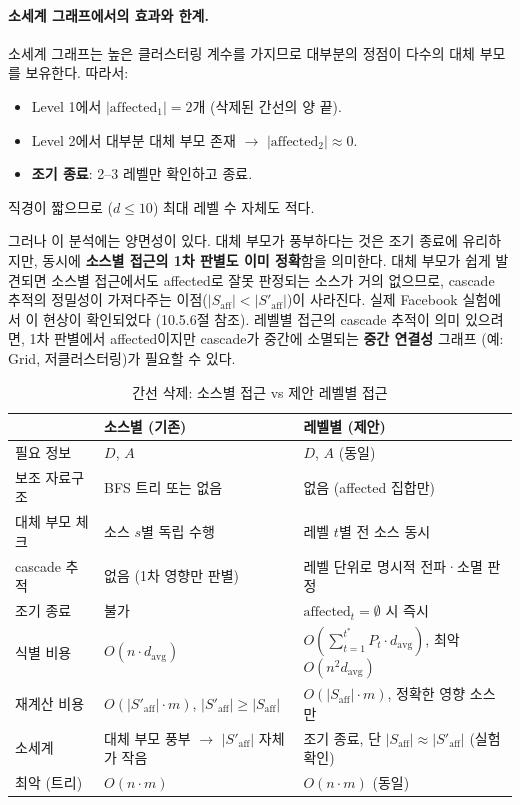 \documentclass[11pt,a4paper]{article}
\begin{document}
\paragraph{소세계 그래프에서의 효과와 한계.}
소세계 그래프는 높은 클러스터링 계수를 가지므로 대부분의 정점이 다수의 대체 부모를 보유한다. 따라서:
\begin{itemize}[leftmargin=1.4em]
  \item Level 1에서 $|\text{affected}_1| = 2$개 (삭제된 간선의 양 끝).
  \item Level 2에서 대부분 대체 부모 존재 $\to$ $|\text{affected}_2| \approx 0$.
  \item \textbf{조기 종료}: 2--3 레벨만 확인하고 종료.
\end{itemize}
직경이 짧으므로 ($d \leq 10$) 최대 레벨 수 자체도 적다.

\noindent 그러나 이 분석에는 양면성이 있다. 대체 부모가 풍부하다는 것은 조기 종료에 유리하지만, 동시에 \textbf{소스별 접근의 1차 판별도 이미 정확}함을 의미한다. 대체 부모가 쉽게 발견되면 소스별 접근에서도 affected로 잘못 판정되는 소스가 거의 없으므로, cascade 추적의 정밀성이 가져다주는 이점($|S_{\text{aff}}| < |S'_{\text{aff}}|$)이 사라진다. 실제 Facebook 실험에서 이 현상이 확인되었다 (10.5.6절 참조). 레벨별 접근의 cascade 추적이 의미 있으려면, 1차 판별에서 affected이지만 cascade가 중간에 소멸되는 \textbf{중간 연결성} 그래프 (예: Grid, 저클러스터링)가 필요할 수 있다.

\begin{table}[H]\centering
\caption{간선 삭제: 소스별 접근 vs 제안 레벨별 접근}
\small
\begin{tabular}{@{}p{2.8cm}p{5.5cm}p{5.5cm}@{}}
\toprule
& \textbf{소스별 (기존)} & \textbf{레벨별 (제안)} \\
\midrule
필요 정보 & $D$, $A$ & $D$, $A$ (동일) \\
보조 자료구조 & BFS 트리 또는 없음 & 없음 (affected 집합만) \\
대체 부모 체크 & 소스 $s$별 독립 수행 & 레벨 $t$별 전 소스 동시 \\
cascade 추적 & 없음 (1차 영향만 판별) & 레벨 단위로 명시적 전파·소멸 판정 \\
조기 종료 & 불가 & $\text{affected}_t = \emptyset$ 시 즉시 \\
식별 비용 & $O(n \cdot d_{\text{avg}})$ & $O(\sum_{t=1}^{t^*} P_t \cdot d_{\text{avg}})$, 최악 $O(n^2 d_{\text{avg}})$ \\
재계산 비용 & $O(|S'_{\text{aff}}| \cdot m)$, $|S'_{\text{aff}}| \geq |S_{\text{aff}}|$ & $O(|S_{\text{aff}}| \cdot m)$, 정확한 영향 소스만 \\
소세계 & 대체 부모 풍부 $\to$ $|S'_{\text{aff}}|$ 자체가 작음 & 조기 종료, 단 $|S_{\text{aff}}| \approx |S'_{\text{aff}}|$ (실험 확인) \\
최악 (트리) & $O(n \cdot m)$ & $O(n \cdot m)$ (동일) \\
\bottomrule
\end{tabular}
\end{table}
\end{document}
